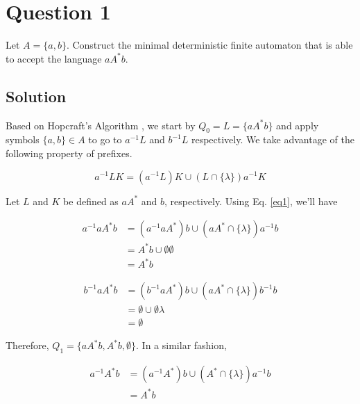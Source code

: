 \section*{Question 1}

Let $A = \{a,b\}$.
Construct the minimal deterministic finite automaton that is able to accept the language $aA^*b$.

\subsection*{Solution}

Based on Hopcraft's Algorithm \cite{hopcroft1971n}, we start by $Q_0 = L = \{aA^*b\}$ and apply symbols $\{a,b\}\in A$ to go to $a^{-1}L$ and $b^{-1}L$ respectively.
We take advantage of the following property of prefixes.

\begin{equation}\label{eq1}
a^{-1}LK = (a^{-1}L)K \cup (L \cap \{\lambda\})a^{-1}K
\end{equation}

Let $L$ and $K$ be defined as $aA^*$ and $b$, respectively.
Using Eq. \ref{eq1}, we'll have

\begin{equation}\label{eq2}
\begin{aligned}
a^{-1}aA^*b &= (a^{-1}aA^*)b \cup (aA^* \cap \{\lambda\})a^{-1}b\\
&= A^*b \cup \emptyset \emptyset\\
&= A^*b
\end{aligned}
\end{equation}

\begin{equation}\label{eq3}
\begin{aligned}
b^{-1}aA^*b &= (b^{-1}aA^*)b \cup (aA^* \cap \{\lambda\})b^{-1}b\\
&= \emptyset \cup \emptyset \lambda\\
&= \emptyset
\end{aligned}
\end{equation}

Therefore, $Q_1 = \{aA^*b, A^*b, \emptyset\}$.
In a similar fashion,

\begin{equation}
\begin{aligned}
a^{-1}A^*b &= (a^{-1}A^*)b \cup (A^* \cap \{\lambda\})a^{-1}b\\
&= A^*b
\end{aligned}
\end{equation}

